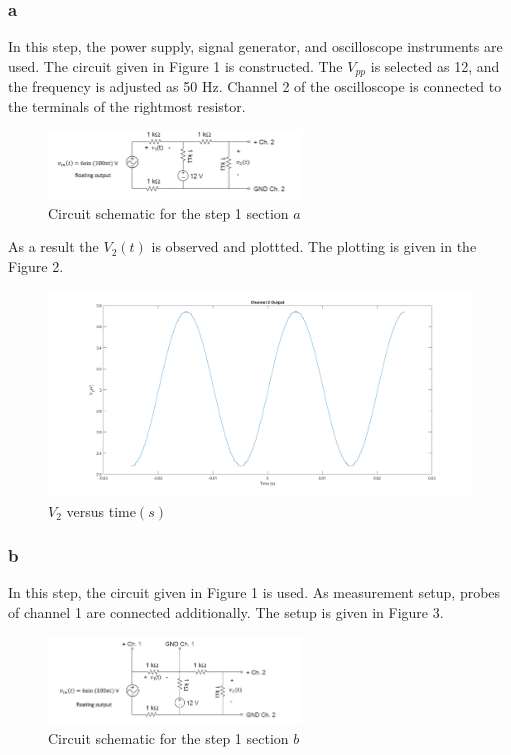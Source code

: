 \documentclass[letterpaper,12pt]{article}
\begin{document}
\subsubsection{a}
In this step, the power supply, signal generator, and oscilloscope instruments are used. The circuit given in Figure 1 is constructed. The \(V_{pp}\) is selected as 12, and the frequency is adjusted as 50 Hz. Channel 2 of the oscilloscope is connected to the terminals of the rightmost resistor. 
\begin{figure}[H]
	\centering
   \includegraphics[width=0.6\textwidth]{1a_sch.png}
   \caption{Circuit schematic for the step 1 section \(a\)}
\end{figure} 
As a result the \(V_2(t)\) is observed and plottted. The plotting is given in the Figure 2. 
\begin{figure}[H]
	\centering
   \includegraphics[width=1\textwidth]{1a.png}
   \caption{\(V_2\) versus time\((s)\) }
\end{figure} 


\subsubsection{b} 
In this step, the circuit given in Figure 1 is used. As measurement setup, probes of channel 1 are connected additionally. The setup is given in Figure 3. 

\begin{figure}[H]
	\centering
   \includegraphics[width=0.6\textwidth]{1b_sch.png}
   \caption{Circuit schematic for the step 1 section \(b\)}
\end{figure} 
\end{document}
